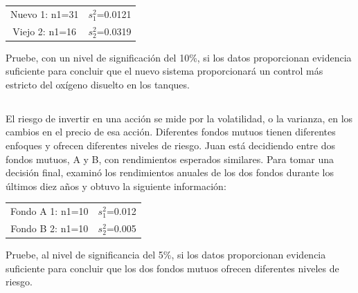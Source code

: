 \documentclass[11pt,letterpaper]{report}
\begin{document}
         \begin{table}[!ht]
             \begin{tabular}{cc}
                 Nuevo 1: n1=31 &$s^2_1$=0.0121\\
                 Viejo 2: n1=16 &$s^2_2$=0.0319
             \end{tabular}
         \end{table}

         Pruebe, con un nivel de significación del 10\%, si los datos proporcionan evidencia suficiente para concluir que el nuevo sistema proporcionará un control más estricto del oxígeno disuelto en los tanques.
       \subsection{}%
         El riesgo de invertir en una acción se mide por la volatilidad, o la varianza, en los cambios en el precio de esa acción. Diferentes fondos mutuos tienen diferentes enfoques y ofrecen diferentes niveles de riesgo. Juan está decidiendo entre dos fondos mutuos, A y B, con rendimientos esperados similares. Para tomar una decisión final, examinó los rendimientos anuales de los dos fondos durante los últimos diez años y obtuvo la siguiente información:
         \begin{table}[!ht]
             \begin{tabular}{cc}
                 Fondo A 1: n1=10 &$s^2_1$=0.012\\
                 Fondo B 2: n1=10 &$s^2_2$=0.005
             \end{tabular}
         \end{table}

         Pruebe, al nivel de significancia del 5\%, si los datos proporcionan evidencia suficiente para concluir que los dos fondos mutuos ofrecen diferentes niveles de riesgo.
\end{document}
